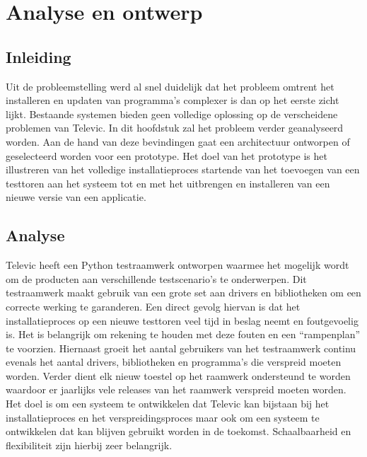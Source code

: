 \chapter{Analyse en ontwerp}\label{sec:anaEnOntwerp}
\section{Inleiding}
Uit de probleemstelling werd al snel duidelijk dat het probleem omtrent het installeren en updaten van programma's complexer is dan op het eerste zicht lijkt.
Bestaande systemen bieden geen volledige oplossing op de verscheidene problemen van Televic.
In dit hoofdstuk zal het probleem verder geanalyseerd worden.
Aan de hand van deze bevindingen gaat een architectuur ontworpen of geselecteerd worden voor een prototype.
Het doel van het prototype is het illustreren van het volledige installatieproces startende van het toevoegen van een testtoren aan het systeem tot en met het uitbrengen en installeren van een nieuwe versie van een applicatie.

\section{Analyse}
Televic heeft een Python testraamwerk ontworpen waarmee het mogelijk wordt om de producten aan verschillende testscenario's te onderwerpen.
Dit testraamwerk maakt gebruik van een grote set aan drivers en bibliotheken om een correcte werking te garanderen.
Een direct gevolg hiervan is dat het installatieproces op een nieuwe testtoren veel tijd in beslag neemt en foutgevoelig is.
Het is belangrijk om rekening te houden met deze fouten en een ``rampenplan'' te voorzien.
Hiernaast groeit het aantal gebruikers van het testraamwerk continu evenals het aantal drivers, bibliotheken en programma's die verspreid moeten worden.
Verder dient elk nieuw toestel op het raamwerk ondersteund te worden waardoor er jaarlijks vele releases van het raamwerk verspreid moeten worden.
Het doel is om een systeem te ontwikkelen dat Televic kan bijstaan bij het installatieproces en het verspreidingsproces maar ook om een systeem te ontwikkelen dat kan blijven gebruikt worden in de toekomst.
Schaalbaarheid en flexibiliteit zijn hierbij zeer belangrijk.

